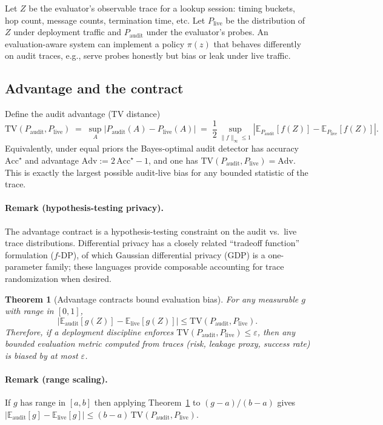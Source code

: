 \documentclass[11pt]{article}
\newtheorem{theorem}{Theorem}
\newcommand{\TV}{\mathrm{TV}}
\newcommand{\E}{\mathbb{E}}
\begin{document}
Let $Z$ be the evaluator's observable trace for a lookup session: timing buckets, hop count, message counts, termination time, etc.
Let $P_{\mathrm{live}}$ be the distribution of $Z$ under deployment traffic and $P_{\mathrm{audit}}$ under the evaluator's probes.
An evaluation-aware system can implement a policy $\pi(z)$ that behaves differently on audit traces, e.g.,
serve probes honestly but bias or leak under live traffic.

\subsection{Advantage and the contract}
Define the audit advantage (TV distance)
\[
\TV(P_{\mathrm{audit}},P_{\mathrm{live}})
\;=\; \sup_{A} \left|P_{\mathrm{audit}}(A)-P_{\mathrm{live}}(A)\right|
\;=\; \frac12 \sup_{\|f\|_{\infty}\le 1} \left|\E_{P_{\mathrm{audit}}}[f(Z)] - \E_{P_{\mathrm{live}}}[f(Z)]\right|.
\]
Equivalently, under equal priors the Bayes-optimal audit detector has accuracy $\mathrm{Acc}^\star$ and advantage $\mathrm{Adv} := 2\,\mathrm{Acc}^\star-1$, and one has $\TV(P_{\mathrm{audit}},P_{\mathrm{live}})=\mathrm{Adv}$.
This is exactly the largest possible audit-live bias for any bounded statistic of the trace.

\paragraph{Remark (hypothesis-testing privacy).}
The advantage contract is a hypothesis-testing constraint on the audit vs.~live trace distributions.
Differential privacy has a closely related ``tradeoff function'' formulation ($f$-DP), of which Gaussian differential privacy (GDP) is a one-parameter family; these languages provide composable accounting for trace randomization when desired.\cite{dong2022gdp}

\begin{theorem}[Advantage contracts bound evaluation bias]\label{thm:adv_contract}
For any measurable $g$ with range in $[0,1]$,
\[
\left|\E_{\mathrm{audit}}[g(Z)] - \E_{\mathrm{live}}[g(Z)]\right| \le \TV(P_{\mathrm{audit}},P_{\mathrm{live}}).
\]
Therefore, if a deployment discipline enforces $\TV(P_{\mathrm{audit}},P_{\mathrm{live}})\le \varepsilon$,
then any bounded evaluation metric computed from traces (risk, leakage proxy, success rate) is biased by at most $\varepsilon$.
\end{theorem}

\paragraph{Remark (range scaling).} If $g$ has range in $[a,b]$ then applying Theorem~\ref{thm:adv_contract} to $(g-a)/(b-a)$ gives $|\E_{\mathrm{audit}}[g]-\E_{\mathrm{live}}[g]|\le (b-a)\,\TV(P_{\mathrm{audit}},P_{\mathrm{live}})$.
\end{document}

